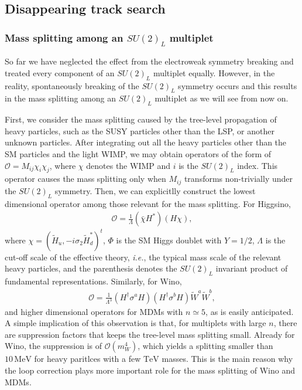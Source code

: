 \documentclass[12pt,twoside,book]{article}
\begin{document}


\subsection{Disappearing track search}
\label{sec:disappearing_track}

\subsubsection*{Mass splitting among an $SU(2)_L$ multiplet}

So far we have neglected the effect from the electroweak symmetry breaking and treated every component of an $SU(2)_L$ multiplet equally.
However, in the reality, spontaneously breaking of the $SU(2)_L$ symmetry occurs and this results in the mass splitting among an $SU(2)_L$ multiplet as we will see from now on.

First, we consider the mass splitting caused by the tree-level propagation of heavy particles, such as the SUSY particles other than the LSP, or another unknown particles.
After integrating out all the heavy particles other than the SM particles and the light WIMP, we may obtain operators of the form of $\mathcal{O} = M_{i j} \chi_i \chi_j$, where $\chi$ denotes the WIMP and $i$ is the $SU(2)_L$ index.
This operator causes the mass splitting only when $M_{i j}$ transforms non-trivially under the $SU(2)_L$ symmetry.
Then, we can explicitlly construct the lowest dimensional operator among those relevant for the mass splitting.
For Higgsino,
\begin{align}
  \mathcal{O} = \frac{1}{\Lambda} (\bar{\chi} H^{*}) (H \chi),
\end{align}
where $\chi = (\tilde{H}_u, -i \sigma_2 \tilde{H}_d^{*})^t$, $\Phi$ is the SM Higgs doublet with $Y = 1/2$, $\Lambda$ is the cut-off scale of the effective theory, \textit{i.e.}, the typical mass scale of the relevant heavy particles, and the parenthesis denotes the $SU(2)_L$ invariant product of fundamental representations.
Similarly, for Wino, \cite{Gherghetta:1999sw}
\begin{align}
  \mathcal{O} = \frac{1}{\Lambda^3} (H^\dagger \sigma^a H) (H^\dagger \sigma^b H) \tilde{W}^a \tilde{W}^b,
\end{align}
and higher dimensional operators for MDMs with $n \simeq 5$, as is easily anticipated.
A simple implication of this observation is that, for multiplets with large $n$, there are suppression factors that keeps the tree-level mass splitting small.
Already for Wino, the suppression is of $\mathcal{O} (m_W^4)$, which yields a splitting smaller than $10\,\mathrm{MeV}$ for heavy paritlces with a few $\mathrm{TeV}$ masses.
This is the main reason why the loop correction plays more important role for the mass splitting of Wino and MDMs.
\end{document}

